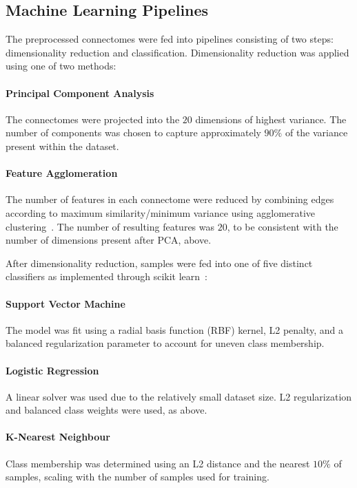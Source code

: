 \documentclass[10pt]{SelfArx} %
\begin{document}
\subsection*{Machine Learning Pipelines}

The preprocessed connectomes were fed into pipelines consisting of two steps: dimensionality reduction and
classification. Dimensionality reduction was applied using one of two methods:

\paragraph{Principal Component Analysis} The connectomes were projected into the $20$ dimensions of highest variance.
The number of components was chosen to capture approximately $90\%$ of the variance present within the dataset.

\paragraph{Feature Agglomeration} The number of features in each connectome were reduced by combining edges according
to maximum similarity/minimum variance using agglomerative clustering~\cite{Ward1963-uh}. The number of resulting
features was $20$, to be consistent with the number of dimensions present after PCA, above.

After dimensionality reduction, samples were fed into one of five distinct classifiers as implemented through scikit
learn~\cite{Pedregosa2011-uz}:

\paragraph{Support Vector Machine} The model was fit using a radial basis function (RBF) kernel, L2 penalty, and a
balanced regularization parameter to account for uneven class membership.

\paragraph{Logistic Regression} A linear solver was used due to the relatively small dataset size. L2 regularization
and balanced class weights were used, as above.

\paragraph{K-Nearest Neighbour} Class membership was determined using an L2 distance and the nearest $10\%$ of
samples, scaling with the number of samples used for training.
\end{document}
